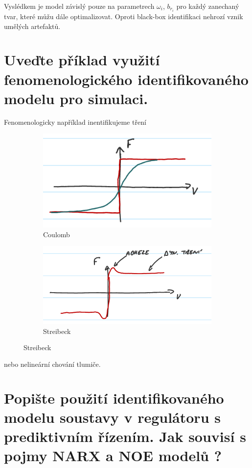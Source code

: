 \documentclass{article}
\begin{document}
	Vyslédkem je model závislý pouze na parametrech $\omega_i$, $b_{r_i}$ 	pro každý zanechaný tvar, které můžu dále optimalizovat. Oproti black-box identifikaci nehrozí vznik umělých artefaktů.

	\section{Uveďte příklad využití fenomenologického identifikovaného modelu pro simulaci. }
	
	Fenomenologicky například inentifikujeme tření
	\begin{figure}[ht!]
		\begin{subfigure}[h!]{.49\textwidth}
			\centering
			\includegraphics[width=\linewidth]{figs/Coulomb.png}
			\caption{Coulomb}
		\end{subfigure}
		\hfill
		\begin{subfigure}[h!]{.49\textwidth}
			\centering
			\includegraphics[width=\linewidth]{figs/Streibeck.png}
			\caption{Streibeck}
		\end{subfigure}
	\end{figure}
	nebo nelineární chování tlumiče.

	\section{Popište použití identifikovaného modelu soustavy v regulátoru s prediktivním řízením. Jak souvisí s pojmy NARX a NOE modelů ? }
\end{document}
